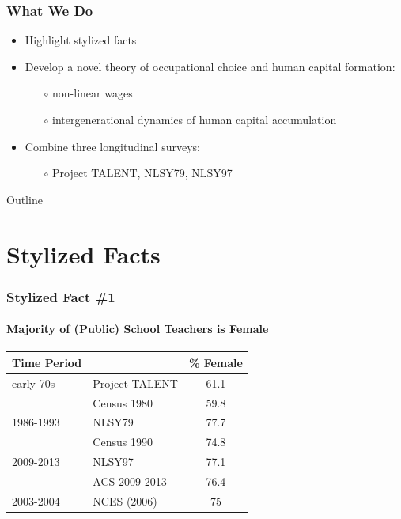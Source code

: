 \documentclass[11pt]{beamer}
\begin{document}
	\begin{frame}
		\frametitle{What We Do}
		\vfill
		\begin{itemize}
			\item Highlight stylized facts
			\vfill
			\item Develop a novel theory of occupational choice and human capital formation: 
			\begin{itemize}
				\item[$\circ$] non-linear wages %
				\item[$\circ$] intergenerational dynamics of human capital accumulation
			\end{itemize}
			\vfill
			\item Combine three longitudinal surveys: 
			\begin{itemize}
				\item[$\circ$] Project TALENT, NLSY79, NLSY97
            \end{itemize}
		\end{itemize}
		\vfill
	\end{frame}

 \begin{frame}{Outline}
\tableofcontents{}
\end{frame}

 \section{Stylized Facts}
	\begin{frame}
		\frametitle{Stylized Fact \#1}
		\framesubtitle{Majority of (Public) School Teachers is Female}
		\begin{table}[h!]
			\centering 
			\begin{tabular}{l l c }
				\toprule
				Time Period & & \% Female \\
				\midrule
                early 70s & Project TALENT  &  61.1 \\
                & Census 1980 &  59.8 \\
                1986-1993 & NLSY79  & 77.7   \\
                & Census 1990 & 74.8 \\
                2009-2013& NLSY97  & 77.1   \\
                & ACS 2009-2013  & 76.4  \\
				\midrule
				2003-2004 & NCES (2006) & 75\\
				\bottomrule
			\end{tabular}
		\end{table}
	\end{frame}
	
\end{document}
